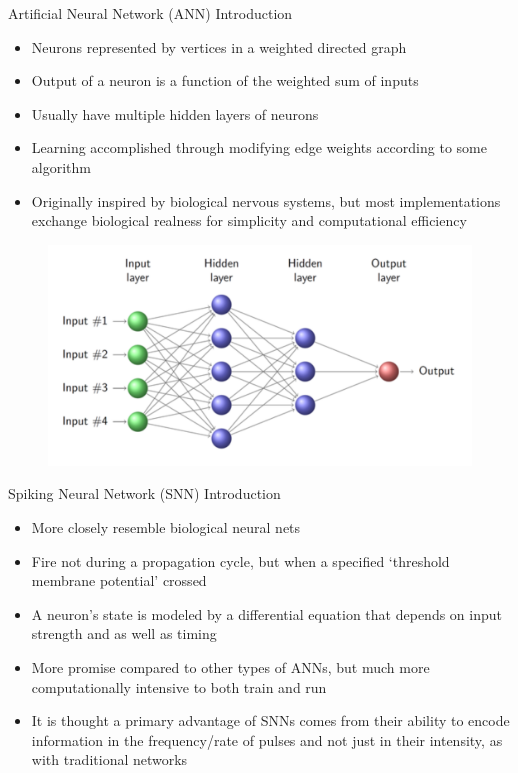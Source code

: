 \documentclass[leqno,presentation,unknownkeysallowed]{beamer}
\begin{document}
\begin{frame}{Artificial Neural Network (ANN) Introduction}
\begin{itemize}
\item Neurons represented by vertices in a weighted directed graph
\item Output of a neuron is a function of the weighted sum of inputs
\item Usually have multiple hidden layers of neurons
\item Learning accomplished through modifying edge weights according to some algorithm
\item Originally inspired by biological nervous systems, but most implementations exchange biological realness for simplicity and computational efficiency
\end{itemize}
\begin{figure}
    \centering
    \includegraphics[scale=0.3]{ann.png}
\end{figure}
\end{frame}

\begin{frame}{Spiking Neural Network (SNN) Introduction}
\begin{itemize}
\item More closely resemble biological neural nets
\item Fire not during a propagation cycle, but when a specified `threshold membrane potential' crossed
\item A neuron's state is modeled by a differential equation that depends on input strength and as well as timing
\item More promise compared to other types of ANNs, but much more computationally intensive to both train and run
\item It is thought a primary advantage of SNNs comes from their ability to encode information in the frequency/rate of pulses and not just in their intensity, as with traditional networks
\end{itemize}
\end{frame}
\end{document}
